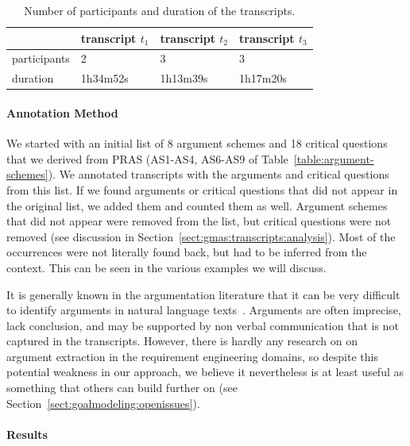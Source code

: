 \begin{table}[ht]
\centering
\begin{tabular}{|l|l|l|l|}
\hline
& transcript $t_1$ & transcript $t_2$ & transcript $t_3$\\
\hline
participants & 2 & 3 & 3\\
\hline
duration & 1h34m52s & 1h13m39s & 1h17m20s\\
\hline
\end{tabular}
\caption{Number of participants and duration of the transcripts.}
\label{table:transcripts:info}
\end{table}

\paragraph{Annotation Method} 

We started with an initial list of 8 argument schemes and 18 critical questions that we derived from PRAS (AS1-AS4, AS6-AS9 of Table~\ref{table:argument-schemes}). We annotated transcripts with the arguments and critical questions from this list. If we found arguments or critical questions that did not appear in the original list, we added them and counted them as well. Argument schemes that did not appear were removed from the list, but critical questions were not removed (see discussion in Section~\ref{sect:gmas:transcripts:analysis}). Most of the occurrences were not literally found back, but had to be inferred from the context. This can be seen in the various examples we will discuss.

It is generally known in the argumentation literature that it can be very difficult to identify arguments in natural language texts~\cite{walton-etal2004}. Arguments are often imprecise, lack conclusion, and may be supported by non verbal communication that is not captured in the transcripts. However, there is hardly any research on on argument extraction in the requirement engineering domains, so despite this potential weakness in our approach, we believe it nevertheless is at least useful as something that others can build further on (see Section~\ref{sect:goalmodeling:openissues}).

\paragraph{Results}

